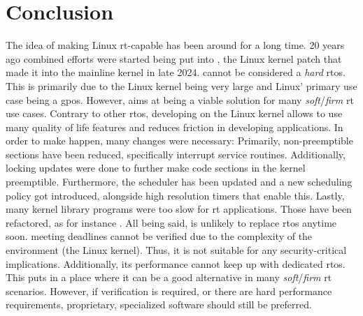 \documentclass[10pt,twocolumn,a4paper]{article}
\begin{document}
\section{Conclusion}
The idea of making Linux \acrshort{rt}-capable has been around for a long time.
20 years ago combined efforts were started being put into , the Linux kernel patch that made it into the mainline kernel in late 2024.
 cannot be considered a \emph{hard} \acrshort{rtos}.
This is primarily due to the Linux kernel being very large and Linux' primary use case being a \acrshort{gpos}.
However,  aims at being a viable solution for many \emph{soft}/\emph{firm} \acrshort{rt} use cases.
Contrary to other \acrshort{rtos}, developing on the Linux kernel allows to use many quality of life features and reduces friction in developing applications.
In order to make  happen, many changes were necessary:
Primarily, non-preemptible sections have been reduced, specifically interrupt service routines.
Additionally, locking updates were done to further make code sections in the kernel preemptible.
Furthermore, the scheduler has been updated and a new scheduling policy got introduced, alongside high resolution timers that enable this.
Lastly, many kernel library programs were too slow for \acrshort{rt} applications.
Those have been refactored, as for instance .
All being said,  is unlikely to replace \acrshort{rtos} anytime soon.
 meeting deadlines cannot be verified due to the complexity of the environment (the Linux kernel).
Thus, it is not suitable for any security-critical implications.
Additionally, its performance cannot keep up with dedicated \acrshort{rtos}.
This puts  in a place where it can be a good alternative in many \emph{soft}/\emph{firm} \acrshort{rt} scenarios.
However, if verification is required, or there are hard performance requirements, proprietary, specialized software should still be preferred.


\printglossaries

\printbibliography
\end{document}
